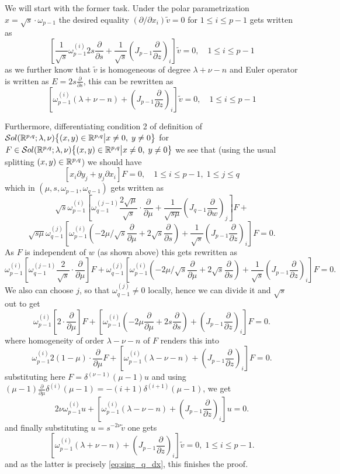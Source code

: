 \documentclass[10pt]{article} %
\theoremstyle{definition}
\theoremstyle{remark}
\begin{document}
\begin{myproof}
	We will start with the former task. Under the polar parametrization $x=\sqrt{s}
	\cdot \omega_{p-1}$ the desired equality $(\partial/\partial x_i)\tilde{v}=0$ for $1\leq i\leq p-1$
	gets written as \[ \left[ \frac{1}{\sqrt{s}}\omega_{p-1}^{(i)}2s\frac{\partial}{\partial s}
	+\frac{1}{\sqrt{s}}\left( J_{p-1}\frac{\partial}{\partial z} \right)_{i}\right]\tilde{v}=0,\quad 1\leq i\leq p-1\]
	as we further know that $\tilde{v}$ is homogeneous of degree $\lambda+\nu-n$ and Euler operator is written as $E=2s\frac{
	\partial}{\partial s}$, this can be rewritten as
	\begin{equation}
	\left[ \omega_{p-1}^{(i)}(\lambda+\nu-n)
		+\left( J_{p-1}\frac{\partial}{\partial z} \right)_{i}\right]\tilde{v}=0,\quad 1\leq i\leq p-1
		\label{eq:sing_q_dx}
	\end{equation}

	Furthermore, differentiating condition 2 of definition of $\mathcal{S}ol(\mathbb{R}^{p,q};\lambda,\nu){\left\{(x,y)\in\mathbb{R}^{p,q}\big| x\neq0,\;y\neq0\right\}}$ for $F\in\mathcal{S}ol(\mathbb{R}^{p,q};\lambda,\nu){\left\{(x,y)\in\mathbb{R}^{p,q}\big| x\neq0,\;y\neq0\right\}}$ we see that (using the usual
	splitting $(x,y)\in\mathbb{R}^{p,q}$) we should have
	\[ \left[ x_i\partial y_j + y_j\partial x_i \right]F=0,\quad 1\le i\le p-1,\;1\leq j\leq q\]
	which in $(\mu,s,\omega_{p-1},\omega_{q-1})$ gets written as
	\[ \sqrt{s}\omega^{(i)}_{p-1}\left[ \omega^{(j-1)}_{q-1}\frac{2\sqrt{\mu}}{\sqrt{s}}\cdot\frac{\partial}{\partial\mu}+
	\frac{1}{\sqrt{s\mu}}\left( J_{q-1}\frac{\partial}{\partial w} \right)_j\right]F+\]\[
	\sqrt{s\mu}\omega^{(j)}_{q-1}\left[ \omega_{p-1}^{(i)}\left( -2\mu/\sqrt{s}\frac{\partial}{\partial\mu}+2\sqrt{s}\frac
	{\partial}{\partial s} \right)+\frac{1}{\sqrt{s}}\left( J_{p-1}\frac{\partial}{\partial z} \right)_i \right]F=0.\]
	As $F$ is independent of $w$ (as shown above) this gets rewritten as
	\[ \omega^{(i)}_{p-1}\left[ \omega^{(j-1)}_{q-1}\frac{2}{\sqrt{s}}\cdot\frac{\partial}{\partial\mu}
	\right]F+
	\omega^{(j)}_{q-1}\left[ \omega_{p-1}^{(i)}\left( -2\mu/\sqrt{s}\frac{\partial}{\partial\mu}+2\sqrt{s}\frac
	{\partial}{\partial s} \right)+\frac{1}{\sqrt{s}}\left( J_{p-1}\frac{\partial}{\partial z} \right)_i \right]F=0.\]
	We also can choose $j$, so that $\omega^{(j)}_{q-1}\neq0$ locally, hence we can divide it and $\sqrt{s}$ out to get
	\[ \omega^{(i)}_{p-1}\left[ {2}\cdot\frac{\partial}{\partial\mu}
	\right]F+
	\left[ \omega_{p-1}^{(i)}\left( -2\mu\frac{\partial}{\partial\mu}+2{s}\frac
	{\partial}{\partial s} \right)+\left( J_{p-1}\frac{\partial}{\partial z} \right)_i \right]F=0.\]
	where homogeneity of order $\lambda-\nu-n$
	of $F$ renders this into
	\[ \omega^{(i)}_{p-1} {2}(1-\mu)\cdot\frac{\partial}{\partial\mu}F+
	\left[ \omega_{p-1}^{(i)}\left( \lambda-\nu-n
	\right)+\left( J_{p-1}\frac{\partial}{\partial z} \right)_i \right]F=0.\]
	substituting here $F=\delta^{(\nu-1)}(\mu-1)u$ and using $(\mu-1)\frac{\partial}{\partial\mu}\delta^{(i)}(\mu-1)=
	-(i+1)\delta^{(i+1)}(\mu-1)$, we get
	\[ 2\nu\omega^{(i)}_{p-1}u+\left[ \omega_{p-1}^{(i)}\left( \lambda-\nu-n
	\right)+\left( J_{p-1}\frac{\partial}{\partial z} \right)_i \right]u=0.\]
	and finally substituting $u=s^{-2\nu}\tilde{v}$ one gets
	\[ \left[ \omega_{p-1}^{(i)}\left( \lambda+\nu-n
	\right)+\left( J_{p-1}\frac{\partial}{\partial z} \right)_i \right]\tilde{v}=0,\;1\leq i\leq p-1.\]
	and as the latter is precisely \eqref{eq:sing_q_dx}, this finishes the proof.
\end{myproof}
\end{document}
